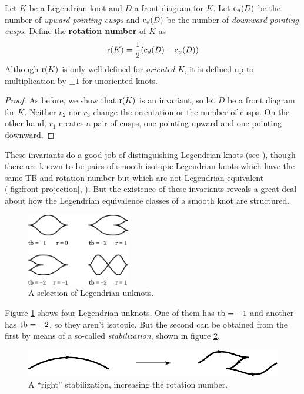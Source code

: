 \begin{definition}
    Let $K$ be a Legendrian knot and $D$ a front diagram for $K$. Let $\operatorname{c}_u(D)$ be the number of \emph{upward-pointing cusps} and $\operatorname{c}_d(D)$ be the number of \emph{downward-pointing cusps}. Define the \textbf{rotation number} of $K$ as 
    \[
        \operatorname{r}(K) = \frac{1}{2} (\operatorname{c}_d(D) - \operatorname{c}_u(D))
    \]
    Although $\operatorname{r}(K)$ is only well-defined for \emph{oriented} $K$, it is defined up to multiplication by $\pm 1$ for unoriented knots.
\end{definition}
\begin{proof}
    As before, we show that $\operatorname{r}(K)$ is an invariant, so let $D$ be a front diagram for $K$. Neither $r_2$ nor $r_3$ change the orientation or the number of cusps. On the other hand, $r_1$ creates a pair of cusps, one pointing upward and one pointing downward.
\end{proof}

These invariants do a good job of distinguishing Legendrian knots (see \cite{eliashberg2008unknot}), though there are known to be pairs of smooth-isotopic Legendrian knots which have the same TB and rotation number but which are not Legendrian equivalent (\ref{fig:front-projection}, \cite{chekanov}). But the existence of these invariants reveals a great deal about how the Legendrian equivalence classes of a smooth knot are structured. 

\begin{figure}[ht]
    \centering
    \includegraphics[width=0.4\textwidth]{images/unknots.pdf}
    \caption{A selection of Legendrian unknots.}%
    \label{fig:unknots}
\end{figure}

Figure \ref{fig:unknots} shows four Legendrian unknots. One of them has $\operatorname{tb} = -1$ and another has $\operatorname{tb} = -2$, so they aren't isotopic. But the second can be obtained from the first by means of a so-called \emph{stabilization}, shown in figure \ref{fig:stabilization}. 

\begin{figure}[ht]
    \centering
    \includegraphics[width=0.6\linewidth]{images/stabilization.pdf}
    \caption{A ``right'' stabilization, increasing the rotation number.}%
    \label{fig:stabilization}
\end{figure}

